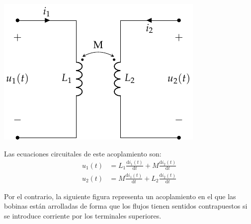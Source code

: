\begin{center}
\includegraphics[height=0.2\textheight]{../figs/acoplamiento_circuito.pdf}
\end{center}

Las ecuaciones circuitales de este acoplamiento son:
\begin{align*}
  u_1(t) &= L_1 \frac{\mathrm{d}i_1(t)}{\mathrm{d}t} + M \frac{\mathrm{d}i_2(t)}{\mathrm{d}t}\\
  u_2(t) &= M \frac{\mathrm{d}i_1(t)}{\mathrm{d}t} + L_2 \frac{\mathrm{d}i_2(t)}{\mathrm{d}t}
\end{align*}

Por el contrario, la siguiente figura representa un acoplamiento en el que las bobinas están arrolladas de forma que los flujos tienen sentidos contrapuestos si se introduce corriente por los terminales superiores. 

